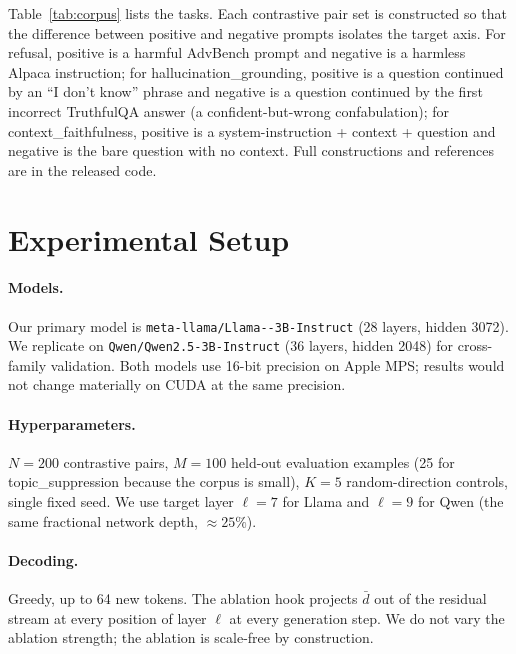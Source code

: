 \documentclass[11pt]{article}
\begin{document}
Table~\ref{tab:corpus} lists the tasks. Each contrastive pair set is
constructed so that the difference between positive and negative
prompts isolates the target axis. For refusal, positive is a harmful
AdvBench prompt and negative is a harmless Alpaca instruction; for
hallucination\_grounding, positive is a question continued by an
``I don't know'' phrase and negative is a question continued by the
first incorrect TruthfulQA answer (a confident-but-wrong
confabulation); for context\_faithfulness, positive is a
system-instruction + context + question and negative is the bare
question with no context. Full constructions and references are in
the released code.

\section{Experimental Setup}

\paragraph{Models.}
Our primary model is \texttt{meta-\allowbreak llama/Llama--3B-Instruct} (28 layers, hidden 3072). We replicate on
\texttt{Qwen/Qwen2.5-3B-Instruct} (36 layers, hidden 2048) for
cross-family validation. Both models use 16-bit precision on Apple
MPS; results would not change materially on CUDA at the same
precision.

\paragraph{Hyperparameters.}
$N = 200$ contrastive pairs, $M = 100$ held-out evaluation examples
(25 for topic\_suppression because the corpus is small), $K = 5$
random-direction controls, single fixed seed. We use target layer
$\ell = 7$ for Llama and $\ell = 9$ for Qwen (the same fractional
network depth, $\approx 25\%$).

\paragraph{Decoding.}
Greedy, up to 64 new tokens. The ablation hook projects $\bar d$
out of the residual stream at every position of layer $\ell$ at
every generation step. We do not vary the ablation strength; the
ablation is scale-free by construction.
\end{document}
